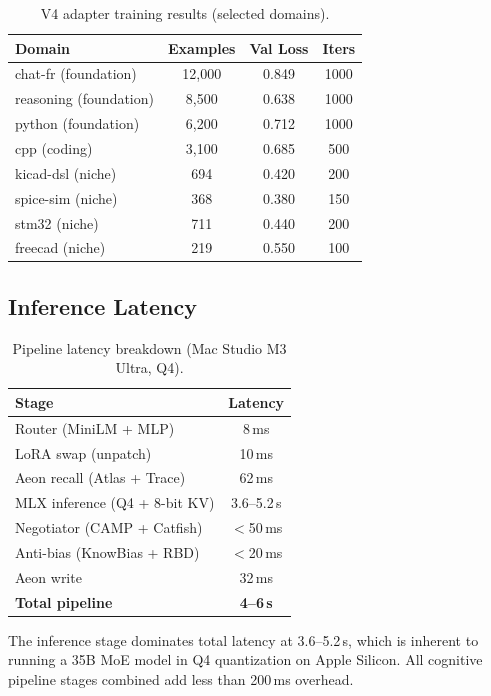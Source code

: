 \documentclass[11pt,a4paper]{article}
\begin{document}
\begin{table}[h]
\centering
\caption{V4 adapter training results (selected domains).}
\label{tab:adapters}
\begin{tabular}{lccc}
\toprule
\textbf{Domain} & \textbf{Examples} & \textbf{Val Loss} & \textbf{Iters} \\
\midrule
chat-fr (foundation) & 12,000 & 0.849 & 1000 \\
reasoning (foundation) & 8,500 & 0.638 & 1000 \\
python (foundation) & 6,200 & 0.712 & 1000 \\
cpp (coding) & 3,100 & 0.685 & 500 \\
kicad-dsl (niche) & 694 & 0.420 & 200 \\
spice-sim (niche) & 368 & 0.380 & 150 \\
stm32 (niche) & 711 & 0.440 & 200 \\
freecad (niche) & 219 & 0.550 & 100 \\
\bottomrule
\end{tabular}
\end{table}

\subsection{Inference Latency}

\begin{table}[h]
\centering
\caption{Pipeline latency breakdown (Mac Studio M3 Ultra, Q4).}
\label{tab:latency}
\begin{tabular}{lc}
\toprule
\textbf{Stage} & \textbf{Latency} \\
\midrule
Router (MiniLM + MLP) & 8\,ms \\
LoRA swap (unpatch) & 10\,ms \\
Aeon recall (Atlas + Trace) & 62\,ms \\
MLX inference (Q4 + 8-bit KV) & 3.6--5.2\,s \\
Negotiator (CAMP + Catfish) & $<$50\,ms \\
Anti-bias (KnowBias + RBD) & $<$20\,ms \\
Aeon write & 32\,ms \\
\midrule
\textbf{Total pipeline} & \textbf{4--6\,s} \\
\bottomrule
\end{tabular}
\end{table}

The inference stage dominates total latency at 3.6--5.2\,s, which is inherent to running a 35B MoE model in Q4 quantization on Apple Silicon. All cognitive pipeline stages combined add less than 200\,ms overhead.
\end{document}
